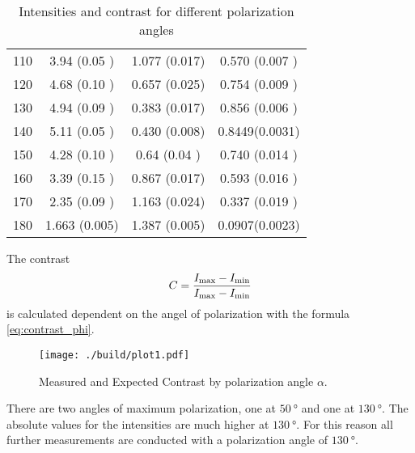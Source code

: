\begin{table}[H]
\begin{tabular}{S[table-format=3.0] S S S[table-format=1.4(2)]}
		110                             & 3.94  (0.05 )              & 1.077 (0.017)              & 0.570 (0.007 ) \\
		120                             & 4.68  (0.10 )              & 0.657 (0.025)              & 0.754 (0.009 ) \\
		130                             & 4.94  (0.09 )              & 0.383 (0.017)              & 0.856 (0.006 ) \\
		140                             & 5.11  (0.05 )              & 0.430 (0.008)              & 0.8449(0.0031) \\
		150                             & 4.28  (0.10 )              & 0.64  (0.04 )              & 0.740 (0.014 ) \\
		160                             & 3.39  (0.15 )              & 0.867 (0.017)              & 0.593 (0.016 ) \\
		170                             & 2.35  (0.09 )              & 1.163 (0.024)              & 0.337 (0.019 ) \\
		180                             & 1.663 (0.005)              & 1.387 (0.005)              & 0.0907(0.0023) \\
		\bottomrule
	\end{tabular}
	\caption{Intensities and contrast for different polarization angles}\label{tab:contrast}
\end{table}

The contrast
\begin{align}
	C = \frac{I_\text{max} -I_\text{min}}{I_\text{max}-I_\text{min}}
\end{align}
is calculated dependent on the angel of polarization with the formula \eqref{eq:contrast_phi}.

\begin{figure}
	\centering
	\texttt{[image: ./build/plot1.pdf]}
	\caption{Measured and Expected Contrast by polarization angle $\alpha $.}
	\label{fig:contrast}
\end{figure}

There are two angles of maximum polarization, one at $\qty{50}{\degree}$ and one
at $\qty{130}{\degree}$. The absolute values for the intensities are much higher
at $\qty{130}{\degree}$. For this reason all further measurements are conducted
with a polarization angle of $\qty{130}{\degree}$.


